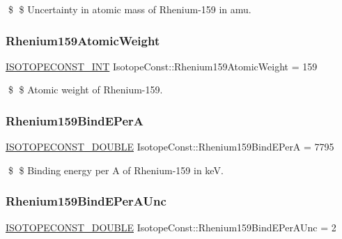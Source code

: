 \$ \$ Uncertainty in atomic mass of Rhenium-\/159 in amu. \mbox{\label{group___isotope_const-_rhenium-_re159_ga209a93876516eb31c8928fde35528945}} 
\subsubsection{\texorpdfstring{Rhenium159\+Atomic\+Weight}{Rhenium159AtomicWeight}}
{\footnotesize\ttfamily \mbox{\hyperlink{group___isotope_const-_macros_ga5f18360b3e99483a35c32d789e62621c}{I\+S\+O\+T\+O\+P\+E\+C\+O\+N\+S\+T\+\_\+\+I\+NT}} Isotope\+Const\+::\+Rhenium159\+Atomic\+Weight = 159}

\$ \$ Atomic weight of Rhenium-\/159. \mbox{\label{group___isotope_const-_rhenium-_re159_ga835fce3b252ef785e08ebbd6979cb305}} 
\subsubsection{\texorpdfstring{Rhenium159\+Bind\+E\+PerA}{Rhenium159BindEPerA}}
{\footnotesize\ttfamily \mbox{\hyperlink{group___isotope_const-_macros_ga8f45a7272ce02c0b4c65c44636ed719a}{I\+S\+O\+T\+O\+P\+E\+C\+O\+N\+S\+T\+\_\+\+D\+O\+U\+B\+LE}} Isotope\+Const\+::\+Rhenium159\+Bind\+E\+PerA = 7795}

\$ \$ Binding energy per A of Rhenium-\/159 in keV. \mbox{\label{group___isotope_const-_rhenium-_re159_gaadcf9222a2f6fcaaf3655ac980124d27}} 
\subsubsection{\texorpdfstring{Rhenium159\+Bind\+E\+Per\+A\+Unc}{Rhenium159BindEPerAUnc}}
{\footnotesize\ttfamily \mbox{\hyperlink{group___isotope_const-_macros_ga8f45a7272ce02c0b4c65c44636ed719a}{I\+S\+O\+T\+O\+P\+E\+C\+O\+N\+S\+T\+\_\+\+D\+O\+U\+B\+LE}} Isotope\+Const\+::\+Rhenium159\+Bind\+E\+Per\+A\+Unc = 2}

